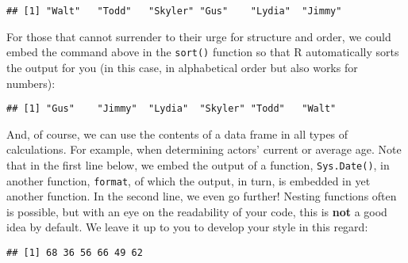 \documentclass[
]{article}
\newenvironment{Shaded}{\begin{snugshade}}{\end{snugshade}}
\newcommand{\FunctionTok}[1]{\textcolor[rgb]{0.00,0.00,0.00}{#1}}
\newcommand{\NormalTok}[1]{#1}
\newcommand{\SpecialCharTok}[1]{\textcolor[rgb]{0.00,0.00,0.00}{#1}}
\newcommand{\StringTok}[1]{\textcolor[rgb]{0.31,0.60,0.02}{#1}}
\begin{document}
\begin{verbatim}
## [1] "Walt"   "Todd"   "Skyler" "Gus"    "Lydia"  "Jimmy"
\end{verbatim}

For those that cannot surrender to their urge for structure and order,
we could embed the command above in the \texttt{sort()} function so that
R automatically sorts the output for you (in this case, in alphabetical
order but also works for numbers):

\begin{Shaded}
\end{Shaded}

\begin{verbatim}
## [1] "Gus"    "Jimmy"  "Lydia"  "Skyler" "Todd"   "Walt"
\end{verbatim}

And, of course, we can use the contents of a data frame in all types of
calculations. For example, when determining actors' current or average
age. Note that in the first line below, we embed the output of a
function, \texttt{Sys.Date()}, in another function, \texttt{format}, of
which the output, in turn, is embedded in yet another function. In the
second line, we even go further! Nesting functions often is possible,
but with an eye on the readability of your code, this is \textbf{not} a
good idea by default. We leave it up to you to develop your style in
this regard:

\begin{Shaded}
\end{Shaded}

\begin{verbatim}
## [1] 68 36 56 66 49 62
\end{verbatim}

\begin{Shaded}
\end{Shaded}
\end{document}
